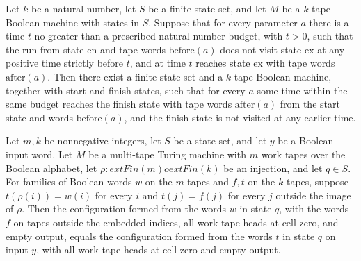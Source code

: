 \begin{theorem}
\label{Turing.cert_call_cut}
\leanok
{}
Let $k$ be a natural number, let $S$ be a finite state set, and let $M$ be a $k$-tape
Boolean machine with states in $S$. Suppose that for every parameter $a$ there is a time
$t$ no greater than a prescribed natural-number budget, with $t>0$, such that the run
from state $\mathrm{en}$ and tape words $\mathrm{before}(a)$ does not visit state
$\mathrm{ex}$ at any positive time strictly before $t$, and at time $t$ reaches state
$\mathrm{ex}$ with tape words $\mathrm{after}(a)$. Then there exist a finite state set
and a $k$-tape Boolean machine, together with start and finish states, such that for
every $a$ some time within the same budget reaches the finish state with tape words
$\mathrm{after}(a)$ from the start state and words $\mathrm{before}(a)$, and the finish
state is not visited at any earlier time.
\end{theorem}

\begin{theorem}
\label{Turing.cert_embed_words}
\leanok
{}
Let $m,k$ be nonnegative integers, let $S$ be a state set, and let $y$ be a Boolean
input word. Let $M$ be a multi-tape Turing machine with $m$ work tapes over the Boolean
alphabet, let $\rho:	ext{Fin}(m)	o	ext{Fin}(k)$ be an injection, and let $q\in S$. For
families of Boolean words $w$ on the $m$ tapes and $f,t$ on the $k$ tapes, suppose
$t(\rho(i))=w(i)$ for every $i$ and $t(j)=f(j)$ for every $j$ outside the image of
$\rho$. Then the configuration formed from the words $w$ in state $q$, with the words
$f$ on tapes outside the embedded indices, all work-tape heads at cell zero, and empty
output, equals the configuration formed from the words $t$ in state $q$ on input $y$,
with all work-tape heads at cell zero and empty output.
\end{theorem}

